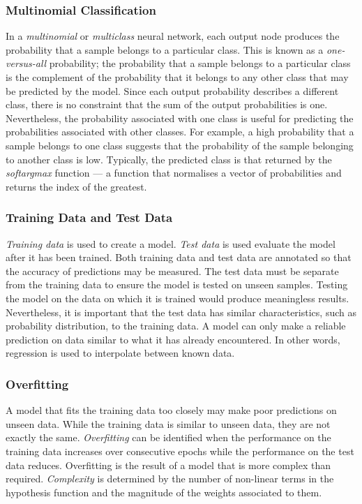\subsubsection{Multinomial Classification}

In a \emph{multinomial} or \emph{multiclass} neural network, each output node produces the probability that a sample belongs to a particular class.
This is known as a \emph{one-versus-all} probability; the probability that a sample belongs to a particular class is the complement of the probability that it belongs to any other class that may be predicted by the model.
Since each output probability describes a different class, there is no constraint that the sum of the output probabilities is one.
Nevertheless, the probability associated with one class is useful for predicting the probabilities associated with other classes.
For example, a high probability that a sample belongs to one class suggests that the probability of the sample belonging to another class is low.
Typically, the predicted class is that returned by the \emph{softargmax} function --- a function that normalises a vector of probabilities and returns the index of the greatest.

\subsubsection{Training Data and Test Data}

\emph{Training data} is used to create a model.
\emph{Test data} is used evaluate the model after it has been trained.
Both training data and test data are annotated so that the accuracy of predictions may be measured.
The test data must be separate from the training data to ensure the model is tested on unseen samples.
Testing the model on the data on which it is trained would produce meaningless results.
Nevertheless, it is important that the test data has similar characteristics, such as probability distribution, to the training data.
A model can only make a reliable prediction on data similar to what it has already encountered.
In other words, regression is used to interpolate between known data.

\subsubsection{Overfitting}

A model that fits the training data too closely may make poor predictions on unseen data.
While the training data is similar to unseen data, they are not exactly the same.
\emph{Overfitting} can be identified when the performance on the training data increases over consecutive epochs while the performance on the test data reduces.
Overfitting is the result of a model that is more complex than required.
\emph{Complexity} is determined by the number of non-linear terms in the hypothesis function and the magnitude of the weights associated to them.

